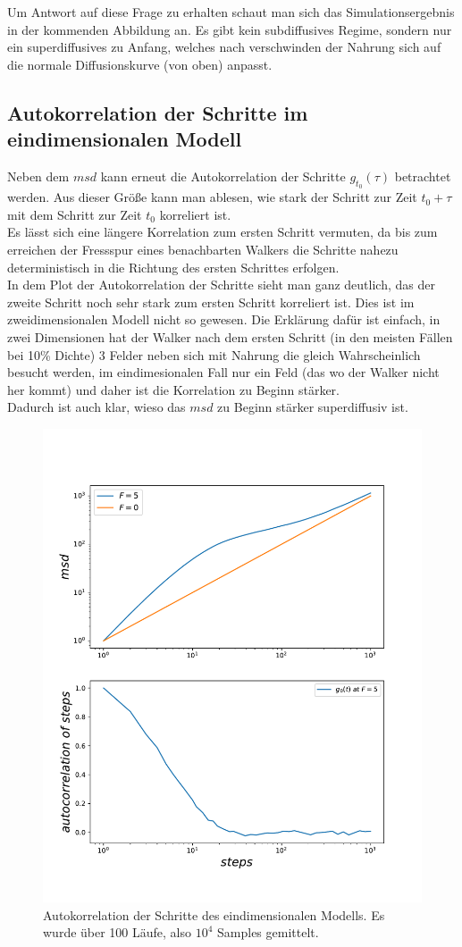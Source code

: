 \documentclass[a4paper, 12pt]{scrartcl}
\begin{document}
\newpage

\noindent Um Antwort auf diese Frage zu erhalten schaut man sich das Simulationsergebnis in der kommenden Abbildung an. Es gibt kein subdiffusives Regime, sondern nur ein superdiffusives zu Anfang, welches nach verschwinden der Nahrung sich auf die normale Diffusionskurve (von oben) anpasst.

\subsection{Autokorrelation der Schritte im eindimensionalen Modell}
Neben dem $msd$ kann erneut die Autokorrelation der Schritte $g_{t_0}(\tau)$ betrachtet werden. Aus dieser Größe kann man ablesen, wie stark der Schritt zur Zeit $t_0 + \tau$ mit dem Schritt zur Zeit $t_0$ korreliert ist.
\\
\noindent Es lässt sich eine längere Korrelation zum ersten Schritt vermuten, da bis zum erreichen der Fressspur eines benachbarten Walkers die Schritte nahezu deterministisch in die Richtung des ersten Schrittes erfolgen.
\\
\noindent In dem Plot der Autokorrelation der Schritte sieht man ganz deutlich, das der zweite Schritt noch sehr stark zum ersten Schritt korreliert ist. Dies ist im zweidimensionalen Modell nicht so gewesen. Die Erklärung dafür ist einfach, in zwei Dimensionen hat der Walker nach dem ersten Schritt (in den meisten Fällen bei 10\% Dichte) 3 Felder neben sich mit Nahrung die gleich Wahrscheinlich besucht werden, im eindimesionalen Fall nur ein Feld (das wo der Walker nicht her kommt) und daher ist die Korrelation zu Beginn stärker. 
\\
Dadurch ist auch klar, wieso das $msd$ zu Beginn stärker superdiffusiv ist.


\begin{figure}[h!]
	\centering
	\includegraphics[scale=0.7]{onedescp.pdf}
	\caption{Autokorrelation der Schritte des eindimensionalen Modells. Es wurde über 100 Läufe, also $10^4$ Samples gemittelt.}
\end{figure}
\end{document}
